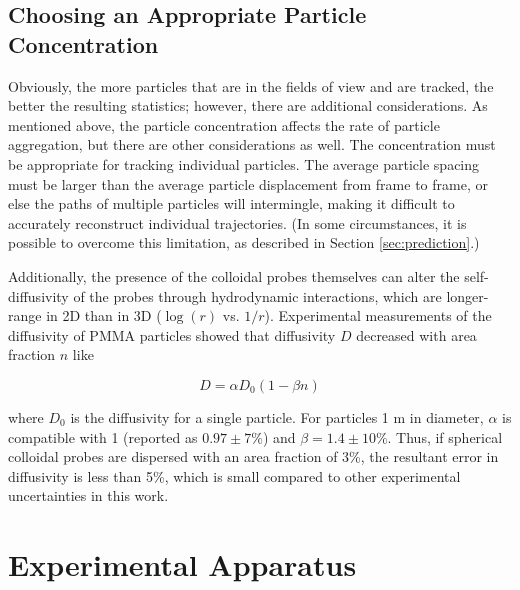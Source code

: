 \subsection{Choosing an Appropriate Particle Concentration}

Obviously, the more particles that are in the fields of view and are tracked, the better the resulting statistics; however, there are additional considerations. As mentioned above, the particle concentration affects the rate of particle aggregation, but there are other considerations as well. The concentration must be appropriate for tracking individual particles. The average particle spacing must be larger than the average particle displacement from frame to frame, or else the paths of multiple particles will intermingle, making it difficult to accurately reconstruct individual trajectories\cite{Crocker1996}. (In some circumstances, it is possible to overcome this limitation, as described in Section \ref{sec:prediction}.)

Additionally, the presence of the colloidal probes themselves can alter the self-diffusivity of the probes through hydrodynamic interactions\cite{Peng2008a}, which are longer-range in 2D than in 3D ($\log(r)$ vs. $1/r$). Experimental measurements of the diffusivity of PMMA particles showed that diffusivity $D$ decreased with area fraction $n$ like

\begin{equation}
D = \alpha D_0(1 - \beta n)
\end{equation}

\noindent where $D_0$ is the diffusivity for a single particle. For particles 1 \textmu m in diameter, $\alpha$ is compatible with 1 (reported as $0.97 \pm 7\%$) and $\beta = 1.4 \pm 10\%$\cite{Peng2008a}. Thus, if spherical colloidal probes are dispersed with an area fraction of 3\%, the resultant error in diffusivity is less than 5\%, which is small compared to other experimental uncertainties in this work.

\section{Experimental Apparatus}

